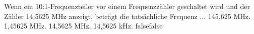     {Wenn ein 10:1-Frequenzteiler vor einem Frequenzzähler geschaltet wird und der Zähler 14,5625 MHz anzeigt, beträgt die tatsächliche Frequenz ...}
    {145,625 MHz.}
    {1,45625 MHz.}
    {14,5625 MHz.}
    {14,5625 kHz.}
    {false}{false}